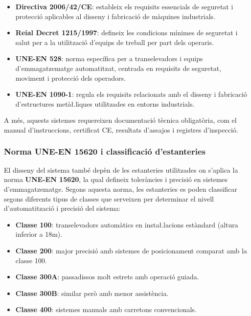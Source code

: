 \documentclass[a4paper,11pt,DIV=13,headings=normal,abstract=true,twoside=semi]{article}
\begin{document}
\begin{itemize}
    \item \textbf{Directiva 2006/42/CE}: estableix els requisits essencials de seguretat i protecció aplicables al disseny i fabricació de màquines industrials.
    \item \textbf{Reial Decret 1215/1997}: defineix les condicions mínimes de seguretat i salut per a la utilització d'equips de treball per part dels operaris.
    \item \textbf{UNE-EN 528}: norma específica per a transelevadors i equips d'emmagatzematge automatitzat, centrada en requisits de seguretat, moviment i protecció dels operadors.
    \item \textbf{UNE-EN 1090-1}: regula els requisits relacionats amb el disseny i fabricació d'estructures metà\l.liques utilitzades en entorns industrials.
\end{itemize}

A més, aquests sistemes requereixen documentació tècnica obligatòria, com el manual d'instruccions, certificat CE, resultats d'assajos i registres d'inspecció.

\subsubsection{Norma UNE-EN 15620 i classificació d'estanteries}

El disseny del sistema també depèn de les estanteries utilitzades \cite{rack_estanterias_norma} on s'aplica la norma \textbf{UNE-EN 15620}, la qual defineix toleràncies i precisió en sistemes d'emmagatzematge. Segons aquesta norma, les estanteries es poden classificar segons diferents tipus de classes que serveixen per determinar el nivell d'automatització i precisió del sistema:

\begin{itemize}
    \item \textbf{Classe 100}: transelevadors automàtics en insta\l.lacions estàndard (altura inferior a 18m).
    \item \textbf{Classe 200}: major precisió amb sistemes de posicionament comparat amb la classe 100.
    \item \textbf{Classe 300A}: passadissos molt estrets amb operació guiada.
    \item \textbf{Classe 300B}: similar però amb menor assistència.
    \item \textbf{Classe 400}: sistemes manuals amb carretons convencionals.
\end{itemize}
\end{document}
